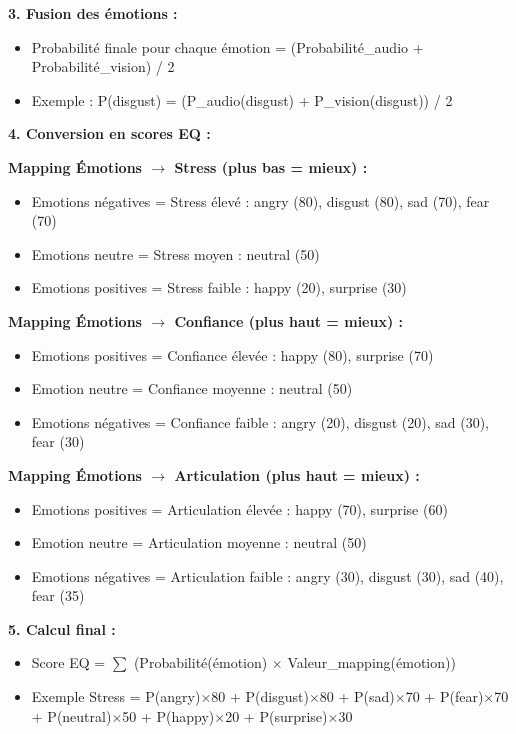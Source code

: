\documentclass[12pt,a4paper]{article}
\begin{document}
\textbf{3. Fusion des émotions :}
\begin{itemize}
    \item Probabilité finale pour chaque émotion = (Probabilité\_audio + Probabilité\_vision) / 2
    \item Exemple : P(disgust) = (P\_audio(disgust) + P\_vision(disgust)) / 2
\end{itemize}

\textbf{4. Conversion en scores EQ :}

\textbf{Mapping Émotions $\rightarrow$ Stress (plus bas = mieux) :}
\begin{itemize}
    \item Emotions négatives = Stress élevé : angry (80), disgust (80), sad (70), fear (70)
    \item Emotions neutre = Stress moyen : neutral (50)
    \item Emotions positives = Stress faible : happy (20), surprise (30)
\end{itemize}

\textbf{Mapping Émotions $\rightarrow$ Confiance (plus haut = mieux) :}
\begin{itemize}
    \item Emotions positives = Confiance élevée : happy (80), surprise (70)
    \item Emotion neutre = Confiance moyenne : neutral (50)
    \item Emotions négatives = Confiance faible : angry (20), disgust (20), sad (30), fear (30)
\end{itemize}

\textbf{Mapping Émotions $\rightarrow$ Articulation (plus haut = mieux) :}
\begin{itemize}
    \item Emotions positives = Articulation élevée : happy (70), surprise (60)
    \item Emotion neutre = Articulation moyenne : neutral (50)
    \item Emotions négatives = Articulation faible : angry (30), disgust (30), sad (40), fear (35)
\end{itemize}

\textbf{5. Calcul final :}
\begin{itemize}
    \item Score EQ = $\sum$ (Probabilité(émotion) $\times$ Valeur\_mapping(émotion))
    \item Exemple Stress = P(angry)$\times$80 + P(disgust)$\times$80 + P(sad)$\times$70 + P(fear)$\times$70 + P(neutral)$\times$50 + P(happy)$\times$20 + P(surprise)$\times$30
\end{itemize}
\end{document}
